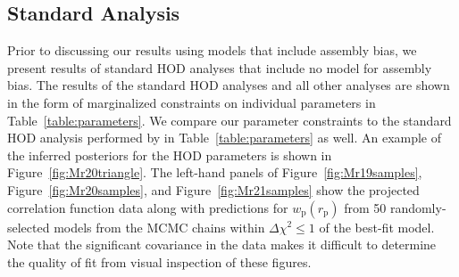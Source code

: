 \documentclass[usenatbib,usegraphicx,letterpaper]{mn2e}
\newcommand{\wprp}{w_{\mathrm{p}}}
\newcommand{\rp}{r_{\mathrm{p}}}
\begin{document}
\subsection{Standard Analysis}
\label{subsection:standard}

Prior to discussing our results using models that include assembly bias, we present
results of standard HOD analyses that include no model for assembly bias. The results of
the standard HOD analyses and all other analyses are shown in the form of marginalized
constraints on individual parameters in Table~\ref{table:parameters}. We compare our parameter
constraints to the standard HOD analysis performed by \citet{zehavi_etal11} in Table~\ref{table:parameters}
as well. An example of the inferred posteriors for the HOD parameters is shown in Figure~\ref{fig:Mr20triangle}.
The left-hand panels of Figure~\ref{fig:Mr19samples}, Figure~\ref{fig:Mr20samples}, and Figure~\ref{fig:Mr21samples}
show the projected correlation function data along with predictions for $\wprp(\rp)$ from 50 randomly-selected
models from the MCMC chains within $\Delta \chi^2 \le 1$ of the best-fit model.
Note that the significant covariance in the data makes it difficult to
determine the quality of fit from visual inspection of these figures.
\end{document}

